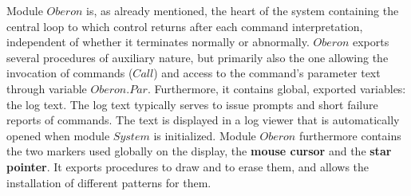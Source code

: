 Module $Oberon$ is, as already mentioned, the heart of the system containing the central loop to
which control returns after each command interpretation, independent of whether it terminates
normally or abnormally. $Oberon$ exports several procedures of auxiliary nature, but primarily also
the one allowing the invocation of commands ($Call$) and access to the command's parameter text
through variable $Oberon.Par$. Furthermore, it contains global, exported variables: the log text. The
log text typically serves to issue prompts and short failure reports of commands. The text is
displayed in a log viewer that is automatically opened when module $System$ is initialized. Module
$Oberon$ furthermore contains the two markers used globally on the display, the \textbf{mouse cursor} and
the \textbf{star pointer}. It exports procedures to draw and to erase them, and allows the installation of
different patterns for them.

